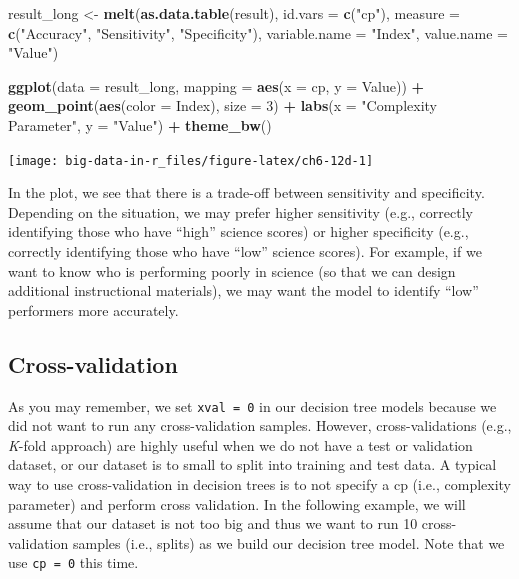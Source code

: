 \documentclass[]{book}
\newenvironment{Shaded}{\begin{snugshade}}{\end{snugshade}}
\newcommand{\DataTypeTok}[1]{\textcolor[rgb]{0.13,0.29,0.53}{#1}}
\newcommand{\DecValTok}[1]{\textcolor[rgb]{0.00,0.00,0.81}{#1}}
\newcommand{\KeywordTok}[1]{\textcolor[rgb]{0.13,0.29,0.53}{\textbf{#1}}}
\newcommand{\NormalTok}[1]{#1}
\newcommand{\OperatorTok}[1]{\textcolor[rgb]{0.81,0.36,0.00}{\textbf{#1}}}
\newcommand{\StringTok}[1]{\textcolor[rgb]{0.31,0.60,0.02}{#1}}
\begin{document}
\begin{Shaded}
\begin{Highlighting}[]
\NormalTok{result_long <-}\StringTok{ }\KeywordTok{melt}\NormalTok{(}\KeywordTok{as.data.table}\NormalTok{(result),}
                    \DataTypeTok{id.vars =} \KeywordTok{c}\NormalTok{(}\StringTok{"cp"}\NormalTok{),}
                    \DataTypeTok{measure =} \KeywordTok{c}\NormalTok{(}\StringTok{"Accuracy"}\NormalTok{, }\StringTok{"Sensitivity"}\NormalTok{, }\StringTok{"Specificity"}\NormalTok{),}
                    \DataTypeTok{variable.name =} \StringTok{"Index"}\NormalTok{,}
                    \DataTypeTok{value.name =} \StringTok{"Value"}\NormalTok{)}

\KeywordTok{ggplot}\NormalTok{(}\DataTypeTok{data =}\NormalTok{ result_long,}
       \DataTypeTok{mapping =} \KeywordTok{aes}\NormalTok{(}\DataTypeTok{x =}\NormalTok{ cp, }\DataTypeTok{y =}\NormalTok{ Value)) }\OperatorTok{+}
\StringTok{  }\KeywordTok{geom_point}\NormalTok{(}\KeywordTok{aes}\NormalTok{(}\DataTypeTok{color =}\NormalTok{ Index), }\DataTypeTok{size =} \DecValTok{3}\NormalTok{) }\OperatorTok{+}
\StringTok{  }\KeywordTok{labs}\NormalTok{(}\DataTypeTok{x =} \StringTok{"Complexity Parameter"}\NormalTok{, }\DataTypeTok{y =} \StringTok{"Value"}\NormalTok{) }\OperatorTok{+}
\StringTok{  }\KeywordTok{theme_bw}\NormalTok{()}
\end{Highlighting}
\end{Shaded}

\texttt{[image: big-data-in-r\_files/figure-latex/ch6-12d-1]}

In the plot, we see that there is a trade-off between sensitivity and specificity. Depending on the situation, we may prefer higher sensitivity (e.g., correctly identifying those who have ``high'' science scores) or higher specificity (e.g., correctly identifying those who have ``low'' science scores). For example, if we want to know who is performing poorly in science (so that we can design additional instructional materials), we may want the model to identify ``low'' performers more accurately.

\hypertarget{cross-validation}{%
\subsection{Cross-validation}\label{cross-validation}}

As you may remember, we set \texttt{xval\ =\ 0} in our decision tree models because we did not want to run any cross-validation samples. However, cross-validations (e.g., \emph{K}-fold approach) are highly useful when we do not have a test or validation dataset, or our dataset is to small to split into training and test data. A typical way to use cross-validation in decision trees is to not specify a cp (i.e., complexity parameter) and perform cross validation. In the following example, we will assume that our dataset is not too big and thus we want to run 10 cross-validation samples (i.e., splits) as we build our decision tree model. Note that we use \texttt{cp\ =\ 0} this time.
\end{document}
